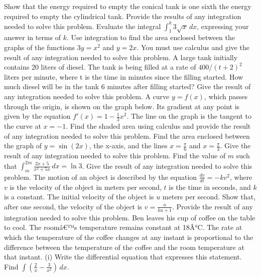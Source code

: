 \documentclass[12pt,addpoints]{exam}
\begin{document}
\begin{questions}
Show that the energy required to empty the conical tank is one sixth the energy required to empty the cylindrical tank. Provide the results of any integration needed to solve this problem.
\fillwithlines{3cm}
\question[5] Evaluate the integral \(\int_{1}^{k} 3\sqrt{x} \, dx\), expressing your answer in terms of \(k\).
\fillwithlines{3cm}
\question[5] Use integration to find the area enclosed between the graphs of the functions \(3y = x^2\) and \(y = 2x\). You must use calculus and give the result of any integration needed to solve this problem.
\fillwithlines{3cm}
\question[5] A large tank initially contains 20 liters of diesel. The tank is being filled at a rate of \(400/(t+2)^2\) liters per minute, where t is the time in minutes since the filling started. How much diesel will be in the tank 6 minutes after filling started? Give the result of any integration needed to solve this problem.
\fillwithlines{3cm}
\question[5] A curve \( y = f(x) \), which passes through the origin, is shown on the graph below. Its gradient at any point is given by the equation \( f'(x) = 1 - \frac{1}{3}x^2 \). The line on the graph is the tangent to the curve at \( x = -1 \). Find the shaded area using calculus and provide the result of any integration needed to solve this problem.
\fillwithlines{3cm}
\question[5] Find the area enclosed between the graph of \( y = \sin(2x) \), the x-axis, and the lines \( x = \frac{\pi}{6} \) and \( x = \frac{\pi}{3} \). Give the result of any integration needed to solve this problem.
\fillwithlines{3cm}
\question[5] Find the value of \( m \) such that \(\int_{m}^{2m} \frac{2x+5}{x^2+5x} \, dx = \ln 3\). Give the result of any integration needed to solve this problem.
\fillwithlines{3cm}
\question[5] The motion of an object is described by the equation \( \frac{dv}{dt} = -kv^2 \), where \( v \) is the velocity of the object in meters per second, \( t \) is the time in seconds, and \( k \) is a constant. The initial velocity of the object is \( u \) meters per second. Show that, after one second, the velocity of the object is \( v = \frac{u}{ku + 1} \). Provide the result of any integration needed to solve this problem.
\fillwithlines{3cm}
\question[5] Ben leaves his cup of coffee on the table to cool. The roomâ€™s temperature remains constant at 18Â°C. The rate at which the temperature of the coffee changes at any instant is proportional to the difference between the temperature of the coffee and the room temperature at that instant. (i) Write the differential equation that expresses this statement.
\fillwithlines{3cm}
\question[5] Find \(\int \left( \frac{2}{x} - \frac{3}{x^2} \right) \, dx\).

\end{questions}
\end{document}
